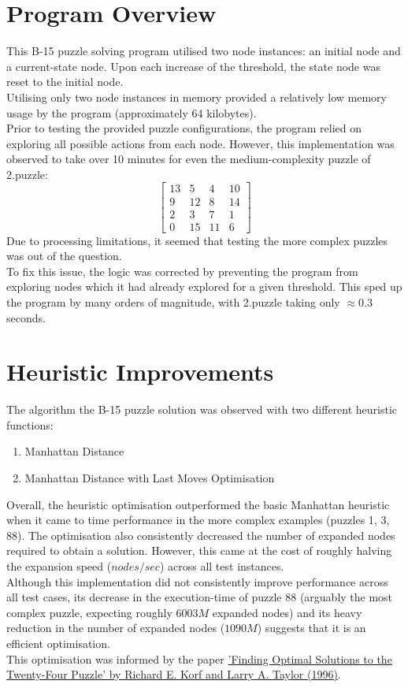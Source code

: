 \documentclass{article}
\begin{document}
\section{Program Overview}
  This B-15 puzzle solving program utilised two node instances: an initial node
  and a current-state node. Upon each increase of the threshold, the state node
  was reset to the initial node.\\
  Utilising only two node instances in memory provided a relatively low memory
  usage by the program (approximately 64 kilobytes). \\
  Prior to testing the provided puzzle configurations, the program relied on
  exploring all possible actions from each node. However, this implementation
  was observed to take over 10 minutes for even the medium-complexity puzzle of
  2.puzzle:
  $$ \begin{bmatrix}
    13 & 5 & 4 &10 \\
     9 &12 & 8 &14 \\
     2 & 3 & 7 & 1 \\
     0 &15 &11 & 6
  \end{bmatrix} $$
  Due to processing limitations, it seemed that testing the more complex
  puzzles was out of the question. \\
  To fix this issue, the logic was corrected by preventing the program from
  exploring nodes which it had already explored for a given threshold. This
  sped up the program by many orders of magnitude, with 2.puzzle taking only
   $\approx 0.3$ seconds.

\section{Heuristic Improvements}
  The algorithm the B-15 puzzle solution was observed with two different heuristic functions:
  \begin{enumerate}
    \item Manhattan Distance
    \item Manhattan Distance with Last Moves Optimisation
  \end{enumerate}
  Overall, the heuristic optimisation outperformed the basic Manhattan
  heuristic when it came to time performance in the more complex examples
  (puzzles 1, 3, 88). The optimisation also consistently decreased the number
  of expanded nodes required to obtain a solution. However, this came at the
  cost of roughly halving the expansion speed ($nodes/sec$) across all test
  instances. \\
  Although this implementation did not consistently improve performance across
  all test cases, its decrease in the execution-time of puzzle 88 (arguably
  the most complex puzzle, expecting roughly $6003M$ expanded nodes) and its
  heavy reduction in the number of expanded nodes ($1090M$) suggests that it
  is an efficient optimisation.
  \\This optimisation was informed by the paper
  \href{http://www.aaai.org/Papers/AAAI/1996/AAAI96-178.pdf}{'Finding Optimal Solutions to the Twenty-Four Puzzle' by Richard E. Korf and Larry A. Taylor (1996)}.
\end{document}
